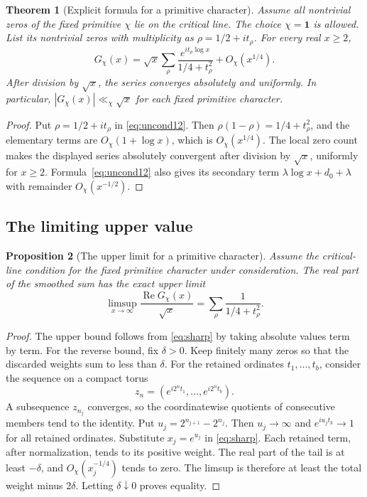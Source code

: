 \documentclass[a4paper,11pt]{article}
\newtheorem{proposition}{Proposition}[section]
\newtheorem{theorem}[proposition]{Theorem}
\theoremstyle{definition}
\theoremstyle{remark}
\newcommand{\real}{\operatorname{Re}}\newcommand{\imag}{\operatorname{Im}}
\numberwithin{equation}{section}
\begin{document}
\begin{theorem}[Explicit formula for a primitive character]\label{thm:explicit}
Assume all nontrivial zeros of the fixed primitive \(\chi\) lie on the critical line. The choice \(\chi=\mathbf1\) is allowed. List its nontrivial zeros with multiplicity as \(\rho=1/2+it_\rho\). For every real \(x\ge2\),
\begin{equation}
 G_\chi(x)=\sqrt{x}\sum_{\rho}
       \frac{e^{it_\rho\log x}}{1/4+t_\rho^2}+O_\chi(x^{1/4}).
 \label{eq:sharp}
\end{equation}
After division by \(\sqrt{x}\), the series converges absolutely and uniformly. In particular, \(|G_\chi(x)|\ll_\chi\sqrt{x}\) for each fixed primitive character. 

\end{theorem}
\begin{proof}
Put \(\rho=1/2+it_\rho\) in \eqref{eq:uncond12}. Then \(\rho(1-\rho)=1/4+t_\rho^2\), and the elementary terms are \(O_\chi(1+\log x)\), which is \(O_\chi(x^{1/4})\). The local zero count makes the displayed series absolutely convergent after division by \(\sqrt x\), uniformly for \(x\ge2\). Formula~\eqref{eq:uncond12} also gives its secondary term \(\lambda\log x+d_0+\lambda\) with remainder \(O_\chi(x^{-1/2})\).
\end{proof}

\subsection{The limiting upper value}\label{nav:I-09}
\label{sec:limsup}
\begin{proposition}[The upper limit for a primitive character]\label{prop:lim}
Assume the critical-line condition for the fixed primitive character under consideration. The real part of the smoothed sum has the exact upper limit
\begin{equation}
 \limsup_{x\to\infty}\frac{\real G_\chi(x)}{\sqrt x}
       =\sum_\rho\frac1{1/4+t_\rho^2}.                     \label{eq:lim}
\end{equation}
\end{proposition}
\begin{proof}
The upper bound follows from \eqref{eq:sharp} by taking absolute values term by term. For the reverse bound, fix \(\delta>0\). Keep finitely many zeros so that the discarded weights sum to less than \(\delta\). For the retained ordinates \(t_1,\ldots,t_b\), consider the sequence on a compact torus
\[
       z_n=(e^{i2^nt_1},\ldots,e^{i2^nt_b}).
\]
A subsequence \(z_{n_j}\) converges, so the coordinatewise quotients of consecutive members tend to the identity. Put \(u_j=2^{n_{j+1}}-2^{n_j}\). Then \(u_j\to\infty\) and \(e^{iu_jt_k}\to1\) for all retained ordinates. Substitute \(x_j=e^{u_j}\) in \eqref{eq:sharp}. Each retained term, after normalization, tends to its positive weight. The real part of the tail is at least \(-\delta\), and \(O_\chi(x_j^{-1/4})\) tends to zero. The limsup is therefore at least the total weight minus \(2\delta\). Letting \(\delta\downarrow0\) proves equality.

\end{proof}
\end{document}
